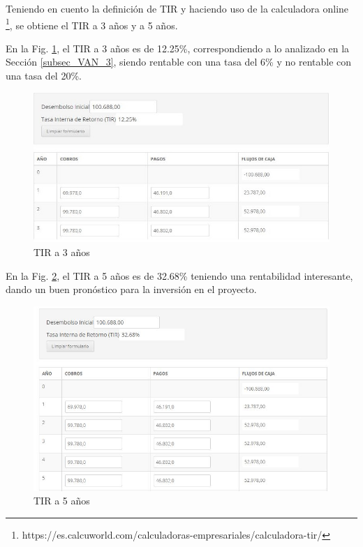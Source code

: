 \documentclass[12pt,a4paper]{book}
\begin{document}
Teniendo en cuento la definición de TIR y haciendo uso de la calculadora online \footnote{https://es.calcuworld.com/calculadoras-empresariales/calculadora-tir/}, se obtiene el TIR a 3 años y a 5 años.

En la Fig. \ref{fig_TIR_3}, el TIR a 3 años es de 12.25\%, correspondiendo a lo analizado en la Sección \ref{subsec_VAN_3}, siendo rentable con una tasa del 6\% y no rentable con una tasa del 20\%.

\begin{figure} [H]
\centering
\includegraphics[width= 13 cm]{../figuras/TIR_3anios.jpg}
\caption{TIR a 3 años}
\label{fig_TIR_3}
\end{figure}

En la Fig. \ref{fig_TIR_5}, el TIR a 5 años es de 32.68\% teniendo una rentabilidad interesante, dando un buen pronóstico para la inversión en el proyecto.

\begin{figure} [H]
\centering
\includegraphics[width= 13 cm]{../figuras/TIR_5anios}
\caption{TIR a 5 años}
\label{fig_TIR_5}
\end{figure}
\end{document}
